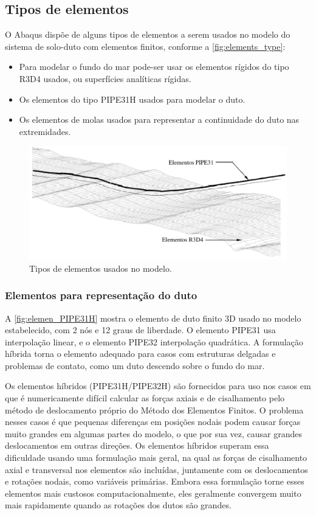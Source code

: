 \subsection{Tipos de elementos}

O Abaqus dispõe de alguns tipos de elementos a serem usados no modelo do sistema de solo-duto com elementos finitos, conforme a \autoref{fig:elements_type}:

\begin{itemize}
    \item Para modelar o fundo do mar pode-ser usar os elementos rígidos do tipo R3D4 usados, ou superfícies analíticas rígidas.
    \item Os elementos do tipo PIPE31H usados para modelar o duto.
    \item Os elementos de molas usados para representar a continuidade do duto nas extremidades.
\end{itemize}

\begin{figure}[!ht]
    \centering
    \caption{Tipos de elementos usados no modelo.}\label{fig:elements_type}
    \includegraphics[width=0.8\linewidth]{imagens/elements_types}
\end{figure}

\subsubsection{Elementos para representação do duto}

A \autoref{fig:elemen_PIPE31H} mostra o elemento de duto finito 3D usado no modelo estabelecido, com 2 nós e 12 graus de liberdade.
O elemento PIPE31 usa interpolação linear, e o elemento PIPE32 interpolação quadrática.
A formulação híbrida torna o elemento adequado para casos com estruturas delgadas e problemas de contato, como um duto descendo sobre o fundo do mar.

Os elementos híbridos (PIPE31H/PIPE32H) são fornecidos para uso nos casos em que é numericamente difícil calcular as forças axiais e de cisalhamento pelo método de deslocamento próprio do Método dos Elementos Finitos.
O problema nesses casos é que pequenas diferenças em posições nodais podem causar forças muito grandes em algumas partes do modelo, o que por sua vez, causar grandes deslocamentos em outras direções.
Os elementos híbridos superam essa dificuldade usando uma formulação mais geral, na qual as forças de cisalhamento axial e transversal nos elementos são incluídas, juntamente com os deslocamentos e rotações nodais, como variáveis primárias.
Embora essa formulação torne esses elementos mais custosos computacionalmente, eles geralmente convergem muito mais rapidamente quando as rotações dos dutos são grandes.


